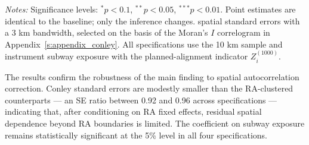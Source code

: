\begin{table}[htbp]
\centering
\caption{Effect of subway exposure on income growth: robustness to Conley spatial standard errors}
\label{tab:iv_results_conley}
\begin{tablenotes}
\scriptsize
\item \textit{Notes:} Significance levels: $^{*}p<0.1$, $^{**}p<0.05$, $^{***}p<0.01$. Point estimates are identical to the baseline; only the inference changes. \citet{conley1999gmm} spatial standard errors with a 3 km bandwidth, selected on the basis of the Moran's $I$ correlogram in Appendix~\ref{s:appendix_conley}. All specifications use the 10 km sample and instrument subway exposure with the planned-alignment indicator $Z_i^{(1000)}$.
\end{tablenotes}
\end{table}

The results confirm the robustness of the main finding to spatial autocorrelation correction. Conley standard errors are modestly smaller than the RA-clustered counterparts --- an SE ratio between 0.92 and 0.96 across specifications --- indicating that, after conditioning on RA fixed effects, residual spatial dependence beyond RA boundaries is limited. The coefficient on subway exposure remains statistically significant at the 5\% level in all four specifications.

